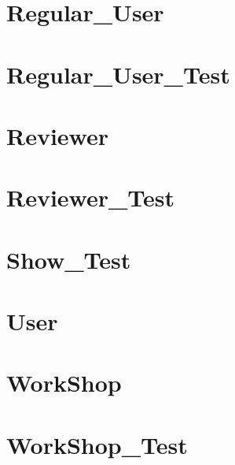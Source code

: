 \documentclass{article}
\begin{document}
\section{Regular\_User}

\section{Regular\_User\_Test}

\section{Reviewer}

\section{Reviewer\_Test}

\section{Show\_Test}

\section{User}

\section{WorkShop}

\section{WorkShop\_Test}

\end{document}
